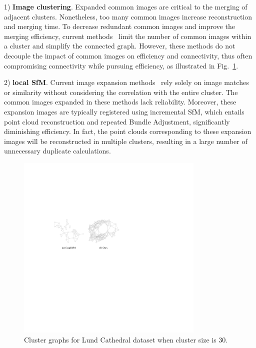 \documentclass[runningheads]{llncs}
\begin{document}
1) \textbf{Image clustering}. 
Expanded common images are critical to the merging of adjacent clusters. Nonetheless, too many common images increase reconstruction and merging time. To decrease redundant common images and improve the merging efficiency, current methods~\cite{gsfm,AccPara,AdaSfM} limit the number of common images within a cluster and simplify the connected graph. However, these methods do not decouple the impact of common images on efficiency and connectivity, thus often compromising connectivity while pursuing efficiency, as illustrated in Fig.~\ref{fig_cluster_graph}.

2) \textbf{local SfM}.
Current image expansion methods~\cite{gsfm,Divide_conquer,AdaSfM,AccPara}  rely solely on image matches or similarity without considering the correlation with the entire cluster. The common images expanded in these methods lack reliability. Moreover, these expansion images are typically registered using incremental SfM, which entails point cloud reconstruction and repeated Bundle Adjustment, significantly diminishing efficiency. In fact, the point clouds corresponding to these expansion images will be reconstructed in multiple clusters, resulting in a large number of unnecessary duplicate calculations.

\begin{figure}[t]
    \centering
        \includegraphics[width=0.8\textwidth]{figs/cluster_graph.pdf}
	\caption{Cluster graphs for Lund Cathedral dataset when cluster size is 30.}
    \label{fig_cluster_graph}
\end{figure}
\end{document}
